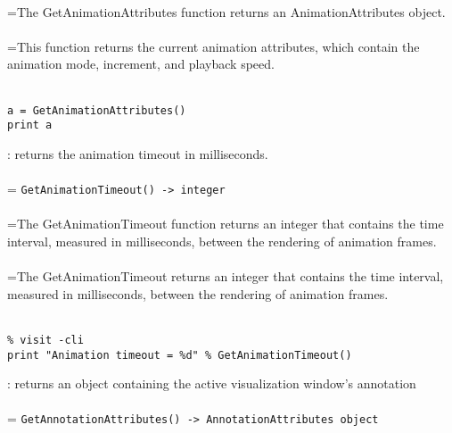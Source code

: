\documentclass[10pt,a4paper]{report}
\begin{document}
 \\ 
\hangindent=\parindent The GetAnimationAttributes function returns an AnimationAttributes object. \\[-3mm] 

 \\ 
\hangindent=\parindent This function returns the current animation attributes, which contain the animation mode, increment, and playback speed. \\[-3mm] 

\\[-6mm]
\begin{verbatim}a = GetAnimationAttributes()
print a
\end{verbatim}
\newpage


{}
: returns the animation timeout in milliseconds.\\[-3mm]

 \\ 
\hangindent=\parindent 
\verb!GetAnimationTimeout() -> integer!\\ [-3mm]

 \\ 
\hangindent=\parindent The GetAnimationTimeout function returns an integer that contains the time interval, measured in milliseconds, between the rendering of animation frames. \\[-3mm] 

 \\ 
\hangindent=\parindent The GetAnimationTimeout returns an integer that contains the time interval, measured in milliseconds, between the rendering of animation frames. \\[-3mm] 

\\[-6mm]
\begin{verbatim}% visit -cli
print "Animation timeout = %d" % GetAnimationTimeout()
\end{verbatim}
\newpage


{}
: returns an object containing the active visualization window's annotation\\[-3mm]

 \\ 
\hangindent=\parindent 
\verb!GetAnnotationAttributes() -> AnnotationAttributes object!\\ [-3mm]
\end{document}
